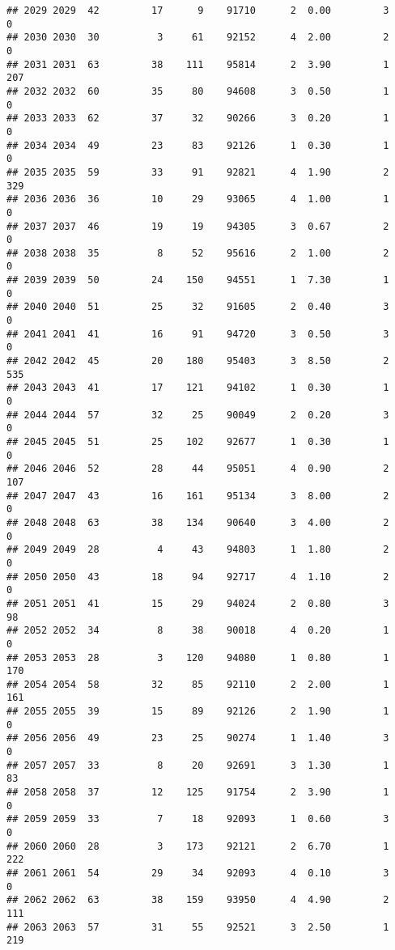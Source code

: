\documentclass[
]{article}
\begin{document}
\begin{verbatim}
## 2029 2029  42         17      9    91710      2  0.00         3        0
## 2030 2030  30          3     61    92152      4  2.00         2        0
## 2031 2031  63         38    111    95814      2  3.90         1      207
## 2032 2032  60         35     80    94608      3  0.50         1        0
## 2033 2033  62         37     32    90266      3  0.20         1        0
## 2034 2034  49         23     83    92126      1  0.30         1        0
## 2035 2035  59         33     91    92821      4  1.90         2      329
## 2036 2036  36         10     29    93065      4  1.00         1        0
## 2037 2037  46         19     19    94305      3  0.67         2        0
## 2038 2038  35          8     52    95616      2  1.00         2        0
## 2039 2039  50         24    150    94551      1  7.30         1        0
## 2040 2040  51         25     32    91605      2  0.40         3        0
## 2041 2041  41         16     91    94720      3  0.50         3        0
## 2042 2042  45         20    180    95403      3  8.50         2      535
## 2043 2043  41         17    121    94102      1  0.30         1        0
## 2044 2044  57         32     25    90049      2  0.20         3        0
## 2045 2045  51         25    102    92677      1  0.30         1        0
## 2046 2046  52         28     44    95051      4  0.90         2      107
## 2047 2047  43         16    161    95134      3  8.00         2        0
## 2048 2048  63         38    134    90640      3  4.00         2        0
## 2049 2049  28          4     43    94803      1  1.80         2        0
## 2050 2050  43         18     94    92717      4  1.10         2        0
## 2051 2051  41         15     29    94024      2  0.80         3       98
## 2052 2052  34          8     38    90018      4  0.20         1        0
## 2053 2053  28          3    120    94080      1  0.80         1      170
## 2054 2054  58         32     85    92110      2  2.00         1      161
## 2055 2055  39         15     89    92126      2  1.90         1        0
## 2056 2056  49         23     25    90274      1  1.40         3        0
## 2057 2057  33          8     20    92691      3  1.30         1       83
## 2058 2058  37         12    125    91754      2  3.90         1        0
## 2059 2059  33          7     18    92093      1  0.60         3        0
## 2060 2060  28          3    173    92121      2  6.70         1      222
## 2061 2061  54         29     34    92093      4  0.10         3        0
## 2062 2062  63         38    159    93950      4  4.90         2      111
## 2063 2063  57         31     55    92521      3  2.50         1      219

\end{verbatim}
\end{document}
